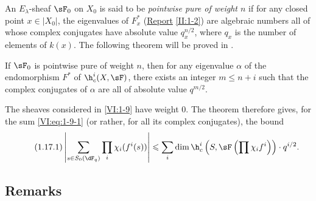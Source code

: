 \documentclass[oneside]{book}
\begin{document}
An $E_\lambda$-sheaf $\sF_0$ on $X_0$ is said to be \emph{pointwise pure of 
weight $n$} if for any closed point $x\in |X_0|$, the eigenvalues of 
$F_x^\ast$ (\hyperref[II]{Report} \ref{II:1-2}) are algebraic numbers 
all of whose complex conjugates have absolute value 
$q_x^{n/2}$, where $q_x$ is the number of elements of $k(x)$. The 
following theorem will be proved in \cite{de80}. 





\begin{theorem_}\label{VI:1-17}
If $\sF_0$ is pointwise pure of weight $n$, then for any eigenvalue $\alpha$ 
of the endomorphism $F^\ast$ of $\h_c^i(X,\sF)$, there exists an integer 
$m\leqslant n+i$ such that the complex conjugates of $\alpha$ are all of 
absolute value $q^{m/2}$.
\end{theorem_}

The sheaves considered in \ref{VI:1-9} have weight $0$. The theorem 
therefore gives, for the sum \ref{VI:eq:1-9-1} (or rather, for all its 
complex conjugates), the bound 
\begin{equation*}\tag{1.17.1}\label{VI:eq:1-17-1}
  \left|\sum_{s\in S_0(\dF_q)} \prod_i \chi_i(f^i(s)) \right| \leqslant \sum_i \dim \h_c^i\left(S,\sF\left(\prod \chi_i f^i\right)\right)\cdot q^{i/2} \text{.}
\end{equation*}





\subsection{Remarks}\label{VI:1-18}
\end{document}
